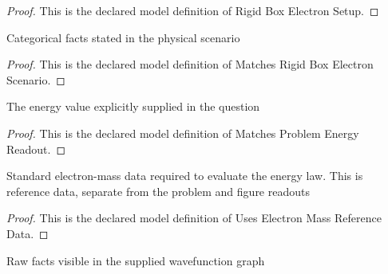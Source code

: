 \begin{proof}
  This is the declared model definition of Rigid Box Electron Setup.
\end{proof}
\begin{definition}
  \label{def:physics:phyx-mini-0656:phyxminiproblems-problemphyxmini0656-matchesrigidboxelectronscenario}
  Categorical facts stated in the physical scenario
\end{definition}
\begin{proof}
  This is the declared model definition of Matches Rigid Box Electron Scenario.
\end{proof}
\begin{definition}
  \label{def:physics:phyx-mini-0656:phyxminiproblems-problemphyxmini0656-matchesproblemenergyreadout}
  The energy value explicitly supplied in the question
\end{definition}
\begin{proof}
  This is the declared model definition of Matches Problem Energy Readout.
\end{proof}
\begin{definition}
  \label{def:physics:phyx-mini-0656:phyxminiproblems-problemphyxmini0656-useselectronmassreferencedata}
  Standard electron-mass data required to evaluate the energy law. This is reference data, separate from the problem and figure readouts
\end{definition}
\begin{proof}
  This is the declared model definition of Uses Electron Mass Reference Data.
\end{proof}
\begin{definition}
  \label{def:physics:phyx-mini-0656:phyxminiproblems-problemphyxmini0656-matchessuppliedwavefunctionfigure}
  Raw facts visible in the supplied wavefunction graph
\end{definition}
